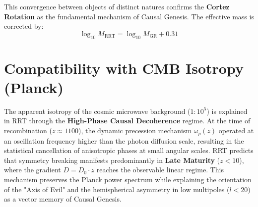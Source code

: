 \documentclass[12pt, a4paper]{article}
\begin{document}
\begin{table}[h]
\centering
\caption{Cosmological Phase Spectrum: From Local Saturation to Deep Fluidity}
\end{table}

This convergence between objects of distinct natures confirms the \textbf{Cortez Rotation} as the fundamental mechanism of Causal Genesis. The effective mass is corrected by:
\[
\log_{10} M_{\text{RRT}} = \log_{10} M_{\text{GR}} + 0.31
\]

\section{Compatibility with CMB Isotropy (Planck)}
The apparent isotropy of the cosmic microwave background ($1:10^5$) is explained in RRT through the \textbf{High-Phase Causal Decoherence} regime. At the time of recombination ($z \approx 1100$), the dynamic precession mechanism $\omega_p(z)$ operated at an oscillation frequency higher than the photon diffusion scale, resulting in the statistical cancellation of anisotropic phases at small angular scales. RRT predicts that symmetry breaking manifests predominantly in \textbf{Late Maturity} ($z < 10$), where the gradient $D = D_0 \cdot z$ reaches the observable linear regime. This mechanism preserves the Planck power spectrum while explaining the orientation of the "Axis of Evil" and the hemispherical asymmetry in low multipoles ($l < 20$) as a vector memory of Causal Genesis.
\end{document}
